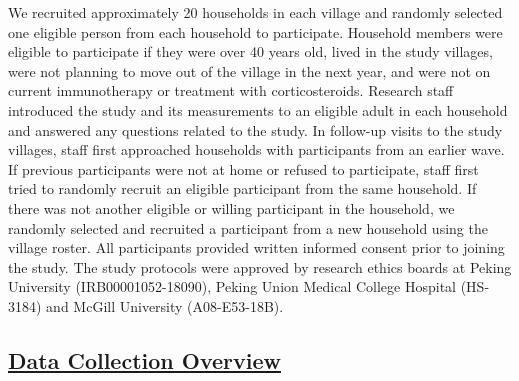 \documentclass[
  letterpaper,
  DIV=11,
  numbers=noendperiod]{scrartcl}
\providecommand{\DIFadd}[1]{{\protect\color{blue}\underline{#1}}} %
\providecommand{\DIFaddbegin}{} %
\providecommand{\DIFaddend}{} %
\providecommand{\DIFdelbegin}{} %
\providecommand{\DIFdelend}{} %
\newcommand{\DIFscaledelfig}{0.5}
\newlength{\DIFdelgraphicswidth} %
\newlength{\DIFdelgraphicsheight} %
\newcommand{\DIFaddincludegraphics}[2][]{{\color{blue}\fbox{\DIFOincludegraphics[#1]{#2}}}} %
\newcommand{\DIFdelincludegraphics}[2][]{%
\sbox{\DIFdelgraphicsbox}{\DIFOincludegraphics[#1]{#2}}%
\settoboxwidth{\DIFdelgraphicswidth}{\DIFdelgraphicsbox} %
\settoboxtotalheight{\DIFdelgraphicsheight}{\DIFdelgraphicsbox} %
\scalebox{\DIFscaledelfig}{%
\parbox[b]{\DIFdelgraphicswidth}{\usebox{\DIFdelgraphicsbox}\\[-\baselineskip] \rule{\DIFdelgraphicswidth}{0em}}\llap{\resizebox{\DIFdelgraphicswidth}{\DIFdelgraphicsheight}{%
\setlength{\unitlength}{\DIFdelgraphicswidth}%
\begin{picture}(1,1)%
\thicklines\linethickness{2pt} %
{\color[rgb]{1,0,0}\put(0,0){\framebox(1,1){}}}%
{\color[rgb]{1,0,0}\put(0,0){\line( 1,1){1}}}%
{\color[rgb]{1,0,0}\put(0,1){\line(1,-1){1}}}%
\end{picture}%
}\hspace*{3pt}}} %
} %
\DeclareRobustCommand{\DIFaddbegin}{\DIFOaddbegin \let\includegraphics\DIFaddincludegraphics} %
\DeclareRobustCommand{\DIFaddend}{\DIFOaddend \let\includegraphics\DIFOincludegraphics} %
\DeclareRobustCommand{\DIFdelbegin}{\DIFOdelbegin \let\includegraphics\DIFdelincludegraphics} %
\DeclareRobustCommand{\DIFdelend}{\DIFOaddend \let\includegraphics\DIFOincludegraphics} %
\begin{document}
We recruited approximately 20 households in each village and randomly
selected one eligible person from each household to participate.
Household members were eligible to participate if they were over 40
years old, lived in the study villages, were not planning to move out of
the village in the next year, and were not on current immunotherapy or
treatment with corticosteroids. Research staff introduced the study and
its measurements to an eligible adult in each household and answered any
questions related to the study. In follow-up visits to the study
villages, staff first approached households with participants from an
earlier wave. If previous participants were not at home or refused to
participate, staff first tried to randomly recruit an eligible
participant from the same household. If there was not another eligible
or willing participant in the household, we randomly selected and
recruited a participant from a new household using the village roster.
All participants provided written informed consent prior to joining the
study. The study protocols were approved by research ethics boards at
Peking University (IRB00001052-18090), Peking Union Medical College
Hospital (HS-3184) and McGill University (A08-E53-18B).

\DIFdelbegin %
\DIFdelend \DIFaddbegin \subsection{\DIFadd{Data Collection Overview}}\label{data-collection-overview}
\DIFaddend 
\end{document}
